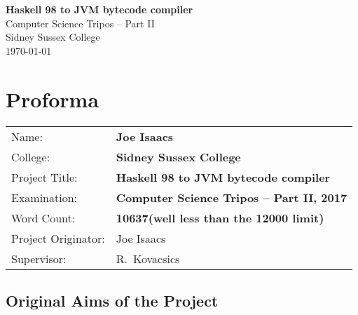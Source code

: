 \documentclass[12pt,a4paper,twoside,openright]{book}
\numberwithin{subcase}{case}
\begin{document}

\thispagestyle{empty}

\pagestyle{empty}
\begingroup


\vspace*{60mm}
\begin{center}
\Huge
\textbf{Haskell 98 to JVM bytecode compiler} \\[5mm]
Computer Science Tripos -- Part II \\[5mm]
Sidney Sussex College \\[5mm]
\today  %
\end{center}


\newpage

\thispagestyle{empty}


\pagestyle{plain}

\frontmatter

\chapter*{Proforma}

{\large
\begin{tabular}{ll}
Name:               & \bf Joe Isaacs                            \\
College:            & \bf Sidney Sussex College                 \\
Project Title:      & \bf Haskell 98 to JVM bytecode compiler   \\
Examination:        & \bf Computer Science Tripos -- Part II, 2017  \\
Word Count:         & \bf 10637\footnotemark[1]
                    (well less than the 12000 limit)  \\
Project Originator: & Joe Isaacs                      \\
Supervisor:         & R.~Kovacsics                    \\ 
\end{tabular}
}

\section*{Original Aims of the Project}
\end{document}
